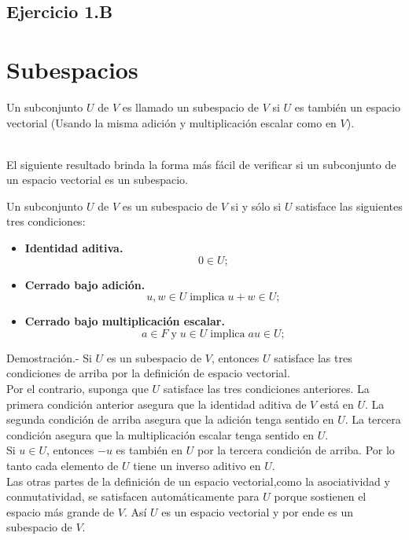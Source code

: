\subsection{Ejercicio 1.B}

\section{Subespacios}

\begin{tcolorbox}[colback=white]
    \begin{def.}[Subespacio]
	Un subconjunto $U$ de $V$ es llamado un subespacio de $V$ si $U$ es también un espacio vectorial (Usando la misma adición y multiplicación escalar como en $V$).\\\\
    \end{def.}
\end{tcolorbox}
\vspace{.5cm}

El siguiente resultado brinda la forma más fácil de verificar si un subconjunto de un espacio vectorial es un subespacio.\\

\begin{teo}

    Un subconjunto $U$ de $V$ es un subespacio de $V$ si y sólo si $U$ satisface las siguientes tres condiciones:
    \begin{itemize}
	\item \textbf{Identidad aditiva.} $$0\in U;$$
	\item \textbf{Cerrado bajo adición.}$$u,w\in U\; \mbox{implica}\; u+w\in U;$$
	\item \textbf{Cerrado bajo multiplicación escalar.}
	    $$a\in F \; \mbox{y}\; u\in U\; \mbox{implica}\; au\in U;$$
    \end{itemize}

	Demostración.-\; Si $U$ es un subespacio de $V$, entonces $U$ satisface las tres condiciones de arriba por la definición de espacio vectorial.\\
	Por el contrario, suponga que $U$ satisface las tres condiciones anteriores. La primera condición anterior asegura que la identidad aditiva de $V$ está en $U$. La segunda condición de arriba asegura que la adición tenga sentido en $U$. La tercera condición asegura que la multiplicación escalar tenga sentido en $U$.\\
	Si $u\in U$, entonces $-u$ es también en $U$ por la tercera condición de arriba. Por lo tanto cada elemento de $U$ tiene un inverso aditivo en $U$.\\
	Las otras partes de la definición de un espacio vectorial,como la asociatividad y conmutatividad, se satisfacen automáticamente para $U$ porque sostienen el espacio más grande de $V$. Así $U$ es un espacio vectorial y por ende es un subespacio de $V$.\\

\end{teo}

